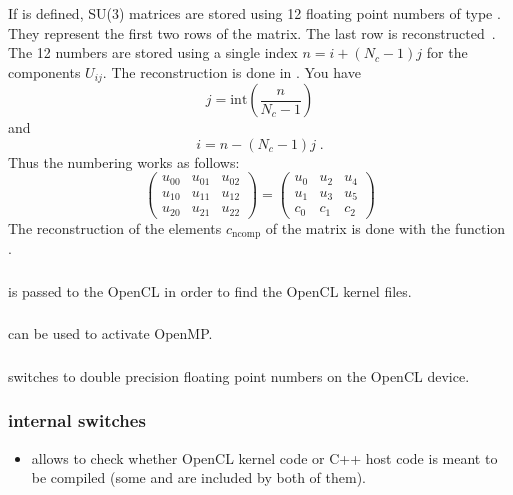 \subsubsection{}
If  is defined, SU(3) matrices are stored using 12 floating point numbers of type . They represent the first two rows of the matrix. The last row is reconstructed~\cite{Clark:2009wm}. The 12 numbers are stored using a single index $n=i+(N_c-1)j$ for the components $U_{ij}$. The reconstruction is done in . You have 
\[ j = \text{int} \left(\frac{n}{N_c-1}\right) \]
and
\[ i = n - (N_c-1)j\;. \]
Thus the numbering works as follows:
\[ \left(\begin{array}{rrr} u_{00} & u_{01} & u_{02} \\ u_{10} & u_{11} & u_{12} \\ u_{20} & u_{21} & u_{22}\end{array}\right)
=
\left(\begin{array}{rrr} u_{0} & u_{2} & u_{4} \\ u_{1} & u_{3} & u_{5} \\ c_0 & c_1 & c_2 \end{array}\right)
\]
The reconstruction of the elements $c_\text{ncomp}$ of the matrix  is done with the function .

\subsubsection{}
 is passed to the OpenCL  in order to find the OpenCL kernel files.
\subsubsection{}
 can be used to activate OpenMP.
\subsubsection{}
 switches to double precision floating point numbers on the OpenCL device.
\subsubsection{internal switches}
\begin{itemize}
\item 
{} allows to check whether OpenCL kernel code or C++ host code is meant to be compiled (some  and  are included by both of them).
\end{itemize}


